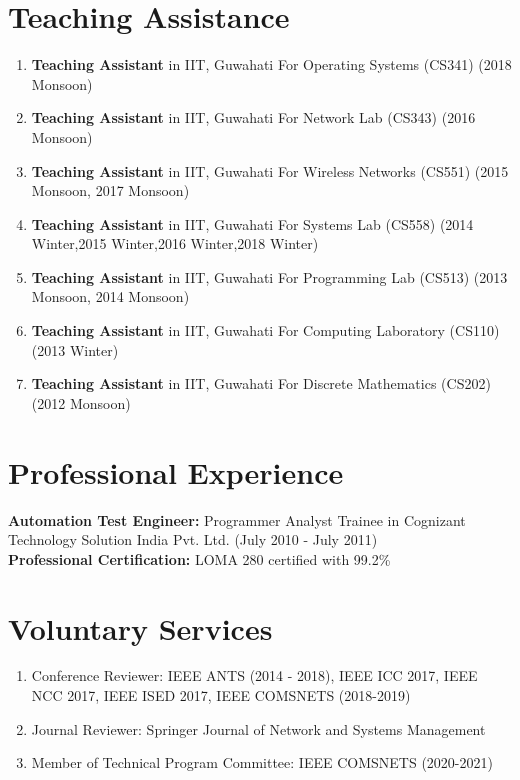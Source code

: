 \documentclass{article}
\begin{document}
\section{Teaching Assistance}	
	\begin{enumerate}
	 \item {\bf Teaching Assistant} in IIT, Guwahati For Operating Systems (CS341) (2018 Monsoon)
	 \item {\bf Teaching Assistant} in IIT, Guwahati For Network Lab (CS343) (2016 Monsoon)
	 \item {\bf Teaching Assistant} in IIT, Guwahati For Wireless Networks (CS551) (2015 Monsoon, 2017 Monsoon)
	 \item {\bf Teaching Assistant} in IIT, Guwahati For Systems Lab (CS558) (2014 Winter,2015 Winter,2016 Winter,2018 Winter)
	 \item {\bf Teaching Assistant} in IIT, Guwahati For Programming Lab (CS513) (2013 Monsoon, 2014 Monsoon)
	 \item {\bf Teaching Assistant} in IIT, Guwahati For Computing Laboratory (CS110) (2013 Winter)
	 \item {\bf Teaching Assistant} in IIT, Guwahati For Discrete Mathematics (CS202)  (2012 Monsoon)
	\end{enumerate}
\section{Professional Experience}
	{\bf Automation Test Engineer:} Programmer Analyst Trainee in Cognizant Technology Solution India Pvt. Ltd. (July 2010 - July 2011)\\[3ex]
	{\bf Professional Certification:} LOMA 280 certified with 99.2\%         
\section{Voluntary Services}
  \begin{enumerate}
   \item Conference Reviewer: IEEE ANTS (2014 - 2018), IEEE ICC 2017, IEEE NCC 2017, IEEE ISED 2017, IEEE COMSNETS (2018-2019)
   \item Journal Reviewer: Springer Journal of Network and Systems Management
   \item Member of Technical Program Committee: IEEE  COMSNETS (2020-2021)
  \end{enumerate}
\end{document}
